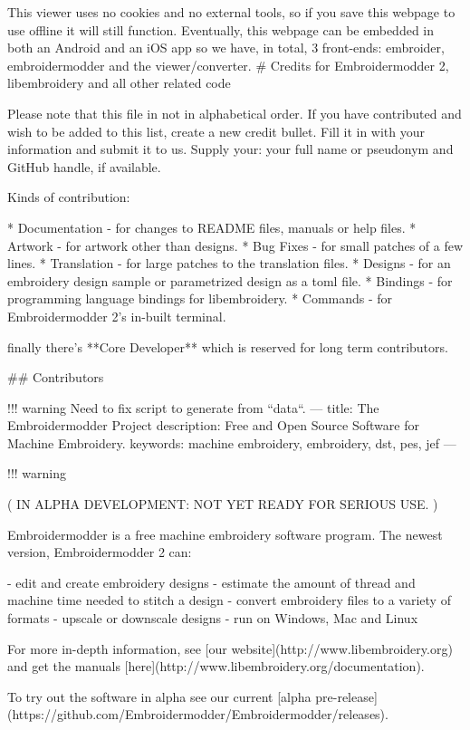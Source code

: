 This viewer uses no cookies and no external tools, so if you save this webpage to use offline it will still function.
Eventually, this webpage can be embedded in both an Android and an iOS app so we have, in total, 3 front-ends: embroider,
embroidermodder and the viewer/converter.
# Credits for Embroidermodder 2, libembroidery and all other related code

Please note that this file in not in alphabetical order. If you have
contributed and wish to be added to this list, create a new credit
bullet. Fill it in with your information and submit it to us. Supply
your: your full name or pseudonym and GitHub handle, if available.

Kinds of contribution:

* Documentation - for changes to README files, manuals or help files.
* Artwork - for artwork other than designs.
* Bug Fixes - for small patches of a few lines.
* Translation - for large patches to the translation files.
* Designs - for an embroidery design sample or parametrized design as a toml file.
* Bindings - for programming language bindings for libembroidery.
* Commands - for Embroidermodder 2's in-built terminal.

finally there's **Core Developer** which is reserved for long term
contributors.

## Contributors

!!! warning
    Need to fix script to generate from ``data``.
---
title: The Embroidermodder Project
description: Free and Open Source Software for Machine Embroidery.
keywords: machine embroidery, embroidery, dst, pes, jef
---

!!! warning

    ( IN ALPHA DEVELOPMENT: NOT YET READY FOR SERIOUS USE. )

Embroidermodder is a free machine embroidery software program.
The newest version, Embroidermodder 2 can:

- edit and create embroidery designs
- estimate the amount of thread and machine time needed to stitch a design
- convert embroidery files to a variety of formats
- upscale or downscale designs
- run on Windows, Mac and Linux

For more in-depth information, see [our website](http://www.libembroidery.org)
and get the manuals [here](http://www.libembroidery.org/documentation).

To try out the software in alpha see our current
[alpha pre-release](https://github.com/Embroidermodder/Embroidermodder/releases).

